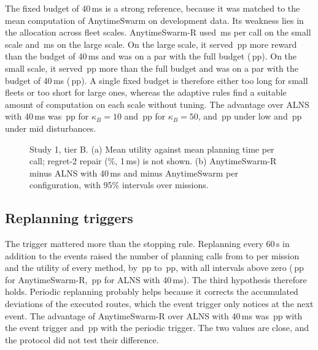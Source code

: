 The fixed budget of 40\,ms is a strong reference, because it was matched to the mean computation of AnytimeSwarm on
development data. Its weakness lies in the allocation across fleet scales. AnytimeSwarm-R used \,ms
per call on the small scale and \,ms on the large scale. On the large scale, it served
\,pp more reward than the budget of 40\,ms and was on a par with the full budget
(\,pp). On the small scale, it served \,pp more than the full budget and was on a
par with the budget of 40\,ms (\,pp). A single fixed budget is therefore either too long for
small fleets or too short for large ones, whereas the adaptive rules find a suitable amount of computation on each scale
without tuning. The advantage over ALNS with 40\,ms was \,pp for $\kappa_B=10$ and
\,pp for $\kappa_B=50$, and \,pp under low and \,pp under mid
disturbances.


\begin{figure}[t]
\centering
{}
\caption{Study 1, tier B. (a) Mean utility against mean planning time per call; regret-2 repair (\%, 1\,ms) is not shown. (b) AnytimeSwarm-R minus ALNS with 40\,ms and minus AnytimeSwarm per configuration, with 95\% intervals over  missions.}\label{fig:main}
\end{figure}

\subsection{Replanning triggers}\label{sec:res-triggers}
The trigger mattered more than the stopping rule. Replanning every 60\,s in addition to the events raised the number of
planning calls from  to  per mission and the utility of every method, by
\,pp to \,pp, with all intervals above zero (\,pp for AnytimeSwarm-R,
\,pp for ALNS with 40\,ms). The third hypothesis therefore holds. Periodic replanning probably helps
because it corrects the accumulated deviations of the executed routes, which the event trigger only notices at the next
event. The advantage of AnytimeSwarm-R over ALNS with 40\,ms was \,pp with the event trigger and
\,pp with the periodic trigger. The two values are close, and the protocol did not test their
difference.

